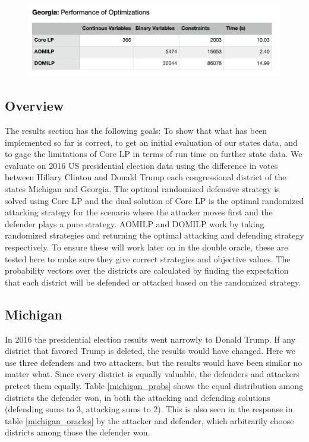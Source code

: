 \documentclass[letterpaper]{article} %
\begin{document}
\begin{figure}
    \includegraphics[width=\linewidth]{georgia_perfs}
    \label{georgia_perfs}
\end{figure}

\subsection{Overview}

The results section has the following goals: To show that what has been implemented so far is correct, to get an initial evaluation of our states data, and to gage the limitations of Core LP in terms of run time on further state data. We evaluate on 2016 US presidential election data using the difference in votes between Hillary Clinton and Donald Trump each congressional district of the states Michigan and Georgia. The optimal randomized defensive strategy is solved using Core LP and the dual solution of Core LP is the optimal randomized attacking strategy for the scenario where the attacker moves first and the defender plays a pure strategy. AOMILP and DOMILP work by taking randomized strategies and returning the optimal attacking and defending strategy respectively. To ensure these will work later on in the double oracle, these are tested here to make sure they give correct strategies and objective values. The probability vectors over the districts are calculated by finding the expectation that each district will be defended or attacked based on the randomized strategy.

\subsection{Michigan}

In 2016 the presidential election results went narrowly to Donald Trump. If any district that favored Trump is deleted, the results would have changed. Here we use three defenders and two attackers, but the results would have been similar no matter what. Since every district is equally valuable, the defenders and attackers pretect them equally. Table \ref{michigan_probs} shows the equal distribution among districts the defender won, in both the attacking and defending solutions (defending sums to 3, attacking sums to 2). This is also seen in the response in table \ref{michigan_oracles} by the attacker and defender, which arbitrarily choose districts among those the defender won. 
\end{document}
